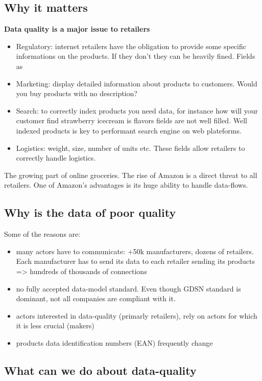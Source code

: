 \subsection{Why it matters}

\textbf{Data quality is a major issue to retailers}

\begin{itemize}
\item Regulatory: internet retailers have the obligation to provide some specific informations on the products. If they don't they can be heavily fined. Fields as 
\item Marketing: display detailed information about products to customers. Would you buy products with no description?
\item Search: to correctly index products you need data, for instance how will your customer find strawberry icecream is flavors fields are not well filled. Well indexed products is key to performant search engine on web plateforms.
\item Logistics: weight, size, number of units etc. These fields allow retailers to correctly handle logistics.
\end{itemize}

The growing part of online groceries.
The rise of Amazon is a direct threat to all retailers. One of Amazon's advantages is its huge ability to handle data-flows.

\subsection{Why is the data of poor quality}

Some of the reasons are:

\begin{itemize}
\item many actors have to communicate: +50k manufacturers, dozens of retailers. Each manufacturer has to send its data to each retailer sending its products => hundreds of thousands of connections
\item no fully accepted data-model standard. Even though GDSN standard is dominant, not all companies are compliant with it.
\item actors interested in data-quality (primarly retailers), rely on actors for which it is less crucial (makers)
\item products data identification numbers (EAN) frequently change
\end{itemize}

\subsection{What can we do about data-quality}


